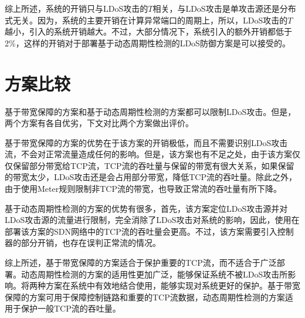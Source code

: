 综上所述，系统的开销只与LDoS攻击的$T$相关，与LDoS攻击是单攻击源还是分布式无关。因为，系统的主要开销在计算异常端口的周期上，所以，LDoS攻击的$T$越小，引入的系统开销越大。不过，大部分情况下，系统引入的额外开销都低于2\%，这样的开销对于部署基于动态周期性检测的LDoS防御方案是可以接受的。


\section{方案比较}
\label{chap05:compare}

基于带宽保障的方案和基于动态周期性检测的方案都可以限制LDoS攻击。但是，两个方案有各自优劣，下文对比两个方案做出评价。

基于带宽保障的方案的优势在于该方案的开销极低，而且不需要识别LDoS攻击流，不会对正常流量造成任何的影响。但是，该方案也有不足之处，由于该方案仅仅保留部分带宽给TCP流，TCP流的吞吐量与保留的带宽有很大关系，如果保留的带宽太少，LDoS攻击还是会占用部分带宽，降低TCP流的吞吐量。除此之外，由于使用Meter规则限制非TCP流的带宽，也导致正常流的吞吐量有所下降。

基于动态周期性检测的方案的优势有很多，首先，该方案定位LDoS攻击源并对LDoS攻击源的流量进行限制，完全消除了LDoS攻击对系统的影响，因此，使用在部署该方案的SDN网络中的TCP流的吞吐量会更高。不过，该方案需要引入控制器的部分开销，也存在误判正常流的情况。

综上所述，基于带宽保障的方案适合于保护重要的TCP流，而不适合于广泛部署。动态周期性检测的方案的适用性更加广泛，能够保证系统不被LDoS攻击所影响。将两种方案在系统中有效地结合使用，能够实现对系统更好的保护。基于带宽保障的方案可用于保障控制链路和重要的TCP流数据，动态周期性检测的方案适用于保护一般TCP流的吞吐量。